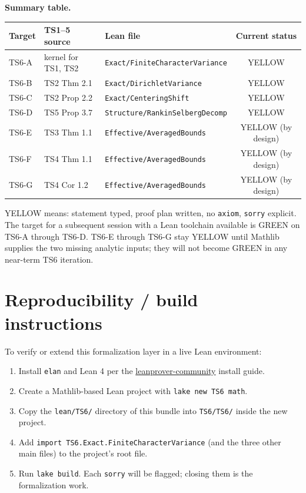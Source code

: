 \documentclass[11pt,a4paper]{article}
\begin{document}
\noindent\textbf{Summary table.}
\begin{center}
\begin{tabular}{lllc}
\toprule
Target & TS1--5 source & Lean file & Current status \\
\midrule
TS6-A & kernel for TS1, TS2 & \texttt{Exact/FiniteCharacterVariance} & YELLOW \\
TS6-B & TS2 Thm 2.1 & \texttt{Exact/DirichletVariance} & YELLOW \\
TS6-C & TS2 Prop 2.2 & \texttt{Exact/CenteringShift} & YELLOW \\
TS6-D & TS5 Prop 3.7 & \texttt{Structure/RankinSelbergDecomp} & YELLOW \\
TS6-E & TS3 Thm 1.1 & \texttt{Effective/AveragedBounds} & YELLOW (by design) \\
TS6-F & TS4 Thm 1.1 & \texttt{Effective/AveragedBounds} & YELLOW (by design) \\
TS6-G & TS4 Cor 1.2 & \texttt{Effective/AveragedBounds} & YELLOW (by design) \\
\bottomrule
\end{tabular}
\end{center}

YELLOW means: statement typed, proof plan written, no \texttt{axiom},
\texttt{sorry} explicit. The target for a subsequent session with a Lean
toolchain available is GREEN on TS6-A through TS6-D. TS6-E through
TS6-G stay YELLOW until Mathlib supplies the two missing analytic
inputs; they will not become GREEN in any near-term TS6 iteration.

\section{Reproducibility / build instructions}\label{sec:repro}

To verify or extend this formalization layer in a live Lean environment:

\begin{enumerate}[nosep,leftmargin=2em]
\item Install \texttt{elan} and Lean 4 per the
  \href{https://leanprover-community.github.io/}{leanprover-community}
  install guide.
\item Create a Mathlib-based Lean project with \texttt{lake new TS6 math}.
\item Copy the \texttt{lean/TS6/} directory of this bundle into
  \texttt{TS6/TS6/} inside the new project.
\item Add \texttt{import TS6.Exact.FiniteCharacterVariance} (and the three
  other main files) to the project's root file.
\item Run \texttt{lake build}. Each \texttt{sorry} will be flagged; closing
  them is the formalization work.
\end{enumerate}
\end{document}
